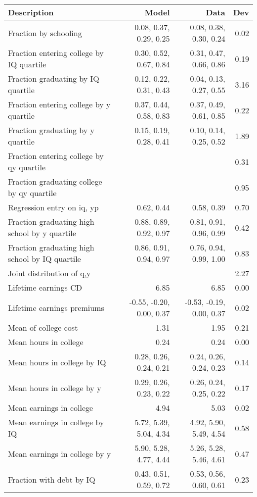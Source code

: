 \begin{tabular}{lrrr}
\hline
Description & Model  & Data  & Dev  \\ 
\hline
Fraction by schooling & 0.08, 0.37, 0.29, 0.25  & 0.08, 0.38, 0.30, 0.24  & 0.02  \\ 
Fraction entering college by IQ quartile & 0.30, 0.52, 0.67, 0.84  & 0.31, 0.47, 0.66, 0.86  & 0.19  \\ 
Fraction graduating by IQ quartile & 0.12, 0.22, 0.31, 0.43  & 0.04, 0.13, 0.27, 0.55  & 3.16  \\ 
Fraction entering college by y quartile & 0.37, 0.44, 0.58, 0.83  & 0.37, 0.49, 0.61, 0.85  & 0.22  \\ 
Fraction graduating by y quartile & 0.15, 0.19, 0.28, 0.41  & 0.10, 0.14, 0.25, 0.52  & 1.89  \\ 
Fraction entering college by qy quartile &   &   & 0.31  \\ 
Fraction graduating college by qy quartile &   &   & 0.95  \\ 
Regression entry on iq, yp & 0.62, 0.44  & 0.58, 0.39  & 0.70  \\ 
Fraction graduating high school by y quartile & 0.88, 0.89, 0.92, 0.97  & 0.81, 0.91, 0.96, 0.99  & 0.42  \\ 
Fraction graduating high school by IQ quartile & 0.86, 0.91, 0.94, 0.97  & 0.76, 0.94, 0.99, 1.00  & 0.83  \\ 
Joint distribution of q,y &   &   & 2.27  \\ 
Lifetime earnings CD & 6.85  & 6.85  & 0.00  \\ 
Lifetime earnings premiums & -0.55, -0.20, 0.00, 0.37  & -0.53, -0.19, 0.00, 0.37  & 0.02  \\ 
Mean of college cost & 1.31  & 1.95  & 0.21  \\ 
Mean hours in college & 0.24  & 0.24  & 0.00  \\ 
Mean hours in college by IQ & 0.28, 0.26, 0.24, 0.21  & 0.24, 0.26, 0.24, 0.23  & 0.14  \\ 
Mean hours in college by y & 0.29, 0.26, 0.23, 0.22  & 0.26, 0.24, 0.25, 0.22  & 0.17  \\ 
Mean earnings in college & 4.94  & 5.03  & 0.02  \\ 
Mean earnings in college by IQ & 5.72, 5.39, 5.04, 4.34  & 4.92, 5.90, 5.49, 4.54  & 0.58  \\ 
Mean earnings in college by y & 5.90, 5.28, 4.77, 4.44  & 5.26, 5.28, 5.46, 4.61  & 0.47  \\ 
Fraction with debt by IQ & 0.43, 0.51, 0.59, 0.72  & 0.53, 0.56, 0.60, 0.61  & 0.23  \\ 

\end{tabular}
